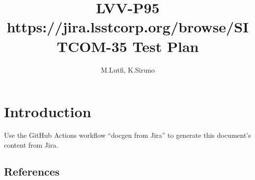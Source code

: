 \documentclass[DM,lsstdraft,toc]{lsstdoc}
\begin{document}
\def\milestoneName{https://jira.lsstcorp.org/browse/SITCOM-35}
\def\milestoneId{LVV-P95}
\def\product{Data Management}


\title{LVV-P95 https://jira.lsstcorp.org/browse/SITCOM-35 Test Plan }
\setDocRef{\lsstDocType-\lsstDocNum}
\date{\vcsDate}
\author{M.Lutfi, K.Siruno}




\maketitle

\section{Introduction}
Use the GitHub Actions workflow ``docgen from Jira'' to generate this document's content from Jira.

\subsection{References}
\label{sect:references}
\renewcommand{\refname}{}




\end{document}
